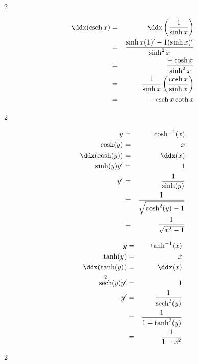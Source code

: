 \documentclass{book}
\DeclareMathOperator{\sech}{sech}
\DeclareMathOperator{\csch}{csch}
\begin{document}
\begin{appendices}
\begin{enumerate}[!HW!]
\begin{multicols}{2}
\begin{pf}
\begin{eqnarray*}
\ddx(\csch x) &=& \ddx\left(\dfrac{1}{\sinh x}\right)\\ &=& \dfrac{\sinh x(1)' - 1(\sinh x)'}{\sinh^2 x}\\ &=& \dfrac{-\cosh x}{\sinh^2 x} \\ &=& -\dfrac{1}{\sinh x}\left(\dfrac{\cosh x}{\sinh x}\right)\\ &=& -\csch x\coth x 
\end{eqnarray*}
\end{pf} 
\end{multicols}

\begin{multicols}{2}
\itemspade \begin{pf}\mbox{}\vspace{-35pt}

\begin{eqnarray*}
y &=& \cosh^{-1}(x)\\
\cosh(y) &=& x\\
\ddx(\cosh(y)) &=& \ddx(x)\\
\sinh(y)y' &=&1\\
y' &=& \dfrac{1}{\sinh(y)}\\ & =& \dfrac{1}{\sqrt{\cosh^2(y)-1}}\\ &=& \dfrac{1}{\sqrt{x^2-1}}
\end{eqnarray*}
\end{pf} \columnbreak

\itemspade \begin{pf}\mbox{}\vspace{-35pt}

\begin{eqnarray*}
y &=& \tanh^{-1}(x)\\
\tanh(y) &=& x\\
\ddx(\tanh(y)) &=& \ddx(x)\\
\sech^2(y)y' &=&1\\
y' &=& \dfrac{1}{\sech^2(y)}\\ &=& \dfrac{1}{1-\tanh^2(y)} \\&=& \dfrac{1}{1-x^2}
\end{eqnarray*}
\end{pf}
\end{multicols}

\begin{multicols}{2}
\item \begin{pf}\mbox{}\vspace{-35pt}


\end{pf}
\end{multicols}
\end{enumerate}
\end{appendices}
\end{document}
